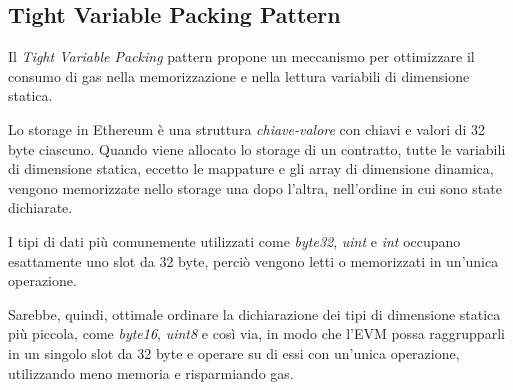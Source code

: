 {{\begin{table}[H]
			\caption{Specifiche String Equality Comparison Pattern}
		\end{table}
	}
	{\subsection{Tight Variable Packing Pattern}
	Il \textit{Tight Variable Packing} pattern propone un meccanismo per ottimizzare il consumo di gas nella memorizzazione e nella lettura variabili di dimensione statica.\par
	Lo storage in Ethereum è una struttura \textit{chiave-valore} con chiavi e valori di 32 byte ciascuno. Quando viene allocato lo storage di un contratto, tutte le variabili di dimensione statica, eccetto le mappature e gli array di dimensione dinamica, vengono memorizzate nello storage una dopo l'altra, nell'ordine in cui sono state dichiarate.\par I tipi di dati più comunemente utilizzati come \textit{byte32}, \textit{uint} e \textit{int} occupano esattamente uno slot da 32 byte, perciò vengono letti o memorizzati in un’unica operazione.\par
	Sarebbe, quindi, ottimale ordinare la dichiarazione dei tipi di dimensione statica più piccola, come \textit{byte16}, \textit{uint8} e così via, in modo che l’EVM possa raggrupparli in un singolo slot da 32 byte e operare su di essi con un'unica operazione, utilizzando meno memoria e risparmiando gas.
	\begin{table}[H]
		\centering
\end{table}}}
